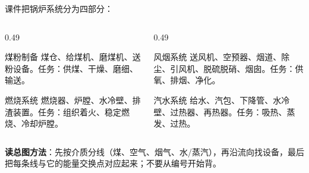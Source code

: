 \begin{frame}[t,shrink]{}
课件把锅炉系统分为四部分：
\begin{columns}[T,onlytextwidth]
\begin{column}{0.49\textwidth}
  \begin{keybox}{煤粉制备}
  \small 煤仓、给煤机、磨煤机、送粉设备。任务：供煤、干燥、磨细、输送。
  \end{keybox}
  \vspace{0.7mm}
  \begin{keybox}{燃烧系统}
  \small 燃烧器、炉膛、水冷壁、排渣装置。任务：组织着火、稳定燃烧、冷却炉膛。
  \end{keybox}
\end{column}
\begin{column}{0.49\textwidth}
  \begin{keybox}{风烟系统}
  \small 送风机、空预器、烟道、除尘、引风机、脱硫脱硝、烟囱。任务：供氧、排烟、净化。
  \end{keybox}
  \vspace{0.7mm}
  \begin{keybox}{汽水系统}
  \small 给水、汽包、下降管、水冷壁、过热器、再热器。任务：吸热、蒸发、过热。
  \end{keybox}
\end{column}
\end{columns}
\vspace{1mm}
\begin{plainbox}
\small \textbf{读总图方法}：先按介质分线（煤、空气、烟气、水/蒸汽），再沿流向找设备，最后把每条线与它的能量交换点对应起来；不要从编号开始背。
\end{plainbox}
\end{frame}

